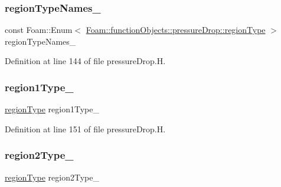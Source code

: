 \subsubsection{\texorpdfstring{region\+Type\+Names\+\_\+}{regionTypeNames\_}}
{\footnotesize\ttfamily const Foam\+::\+Enum$<$ \hyperlink{classFoam_1_1functionObjects_1_1pressureDrop_a2c25b4a3d851e2d45d7a435a73598323}{Foam\+::function\+Objects\+::pressure\+Drop\+::region\+Type} $>$ region\+Type\+Names\+\_\+\hspace{0.3cm}{\ttfamily [static]}}



Definition at line 144 of file pressure\+Drop.\+H.

\mbox{\label{classFoam_1_1functionObjects_1_1pressureDrop_a80a66cc407a5d94c74f3718d56ea4b5b}} 
\subsubsection{\texorpdfstring{region1\+Type\+\_\+}{region1Type\_}}
{\footnotesize\ttfamily \hyperlink{classFoam_1_1functionObjects_1_1pressureDrop_a2c25b4a3d851e2d45d7a435a73598323}{region\+Type} region1\+Type\+\_\+\hspace{0.3cm}{\ttfamily [protected]}}



Definition at line 151 of file pressure\+Drop.\+H.

\mbox{\label{classFoam_1_1functionObjects_1_1pressureDrop_a78c045f115ef05b1f5d4d89f83c754d3}} 
\subsubsection{\texorpdfstring{region2\+Type\+\_\+}{region2Type\_}}
{\footnotesize\ttfamily \hyperlink{classFoam_1_1functionObjects_1_1pressureDrop_a2c25b4a3d851e2d45d7a435a73598323}{region\+Type} region2\+Type\+\_\+\hspace{0.3cm}{\ttfamily [protected]}}



